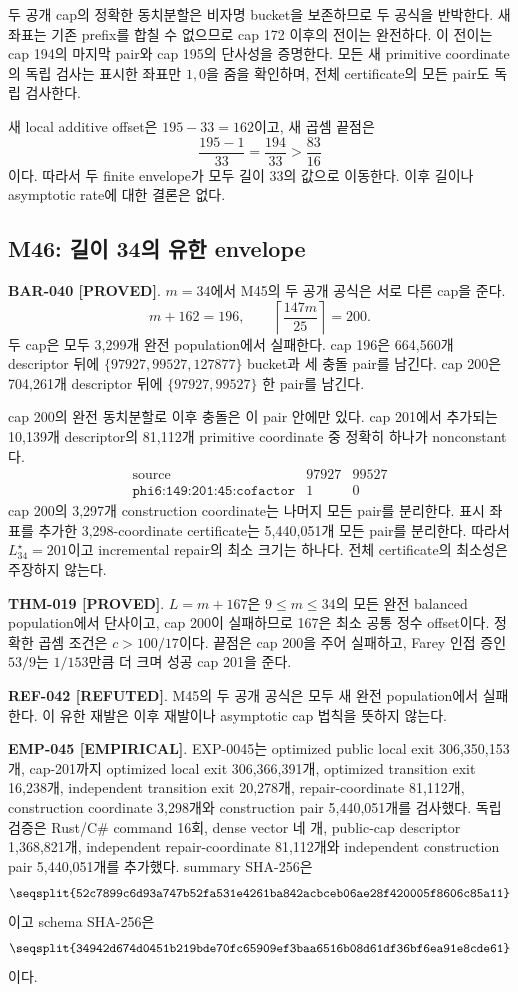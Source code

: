 \documentclass[11pt]{article}
\newcommand{\claimstatus}[2]{\textbf{#1 [#2]}}
\begin{document}
두 공개 cap의 정확한 동치분할은 비자명 bucket을 보존하므로 두 공식을
반박한다. 새 좌표는 기존 prefix를 합칠 수 없으므로 cap 172 이후의
전이는 완전하다. 이 전이는 cap 194의 마지막 pair와 cap 195의
단사성을 증명한다. 모든 새 primitive coordinate의 독립 검사는 표시한
좌표만 \(1,0\)을 줌을 확인하며, 전체 certificate의 모든 pair도
독립 검사한다.

새 local additive offset은 \(195-33=162\)이고, 새 곱셈 끝점은
\[
\frac{195-1}{33}=\frac{194}{33}>\frac{83}{16}
\]
이다. 따라서 두 finite envelope가 모두 길이 33의 값으로 이동한다.
이후 길이나 asymptotic rate에 대한 결론은 없다.

\subsection{M46: 길이 34의 유한 envelope}

\claimstatus{BAR-040}{PROVED}.
\(m=34\)에서 M45의 두 공개 공식은 서로 다른 cap을 준다.
\[
m+162=196,\qquad
\left\lceil\frac{147m}{25}\right\rceil=200.
\]
두 cap은 모두 3,299개 완전 population에서 실패한다. cap 196은
664,560개 descriptor 뒤에
\(\{97927,99527,127877\}\) bucket과 세 충돌 pair를 남긴다.
cap 200은 704,261개 descriptor 뒤에 \(\{97927,99527\}\) 한 pair를
남긴다.

cap 200의 완전 동치분할로 이후 충돌은 이 pair 안에만 있다.
cap 201에서 추가되는 10,139개 descriptor의 81,112개 primitive
coordinate 중 정확히 하나가 nonconstant다.
\[
\begin{array}{c|rr}
\text{source}&97927&99527\\
\hline
\texttt{phi6:149:201:45:cofactor}&1&0
\end{array}
\]
cap 200의 3,297개 construction coordinate는 나머지 모든 pair를
분리한다. 표시 좌표를 추가한 3,298-coordinate certificate는
5,440,051개 모든 pair를 분리한다. 따라서
\(L_{34}^{\star}=201\)이고 incremental repair의 최소 크기는 하나다.
전체 certificate의 최소성은 주장하지 않는다.

\claimstatus{THM-019}{PROVED}.
\(L=m+167\)은 \(9\le m\le34\)의 모든 완전 balanced population에서
단사이고, cap 200이 실패하므로 167은 최소 공통 정수 offset이다.
정확한 곱셈 조건은 \(c>100/17\)이다. 끝점은 cap 200을 주어 실패하고,
Farey 인접 증인 \(53/9\)는 \(1/153\)만큼 더 크며 성공 cap 201을 준다.

\claimstatus{REF-042}{REFUTED}.
M45의 두 공개 공식은 모두 새 완전 population에서 실패한다. 이 유한
재발은 이후 재발이나 asymptotic cap 법칙을 뜻하지 않는다.

\claimstatus{EMP-045}{EMPIRICAL}.
EXP-0045는 optimized public local exit 306,350,153개, cap-201까지
optimized local exit 306,366,391개, optimized transition exit
16,238개, independent transition exit 20,278개,
repair-coordinate 81,112개, construction coordinate 3,298개와
construction pair 5,440,051개를 검사했다. 독립 검증은 Rust/C\#
command 16회, dense vector 네 개, public-cap descriptor 1,368,821개,
independent repair-coordinate 81,112개와 independent construction
pair 5,440,051개를 추가했다. summary SHA-256은
\[
\texttt{\seqsplit{52c7899c6d93a747b52fa531e4261ba842acbceb06ae28f420005f8606c85a11}}
\]
이고 schema SHA-256은
\[
\texttt{\seqsplit{34942d674d0451b219bde70fc65909ef3baa6516b08d61df36bf6ea91e8cde61}}
\]
이다.
\end{document}
